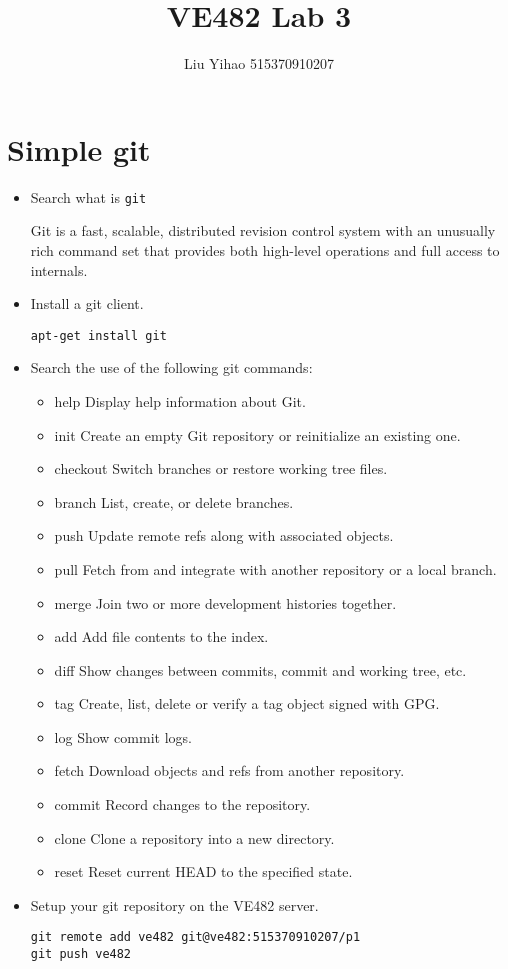 \documentclass{article}
\title{VE482 Lab 3}
\author{Liu Yihao 515370910207}
\date{}
\begin{document}
\maketitle

\section{Simple git}
\begin{itemize}
\item Search what is \texttt{git} 

Git is a fast, scalable, distributed revision control system with
       an unusually rich command set that provides both high-level
       operations and full access to internals.
\item Install a git client.
\begin{verbatim}
apt-get install git
\end{verbatim}
\item Search the use of the following git commands:
\begin{itemize}
\item help Display help information about Git.
\item init Create an empty Git repository or reinitialize an existing one.
\item checkout Switch branches or restore working tree files.
\item branch List, create, or delete branches.
\item push Update remote refs along with associated objects.
\item pull Fetch from and integrate with another repository or a local branch.
\item merge Join two or more development histories together.
\item add Add file contents to the index.
\item diff Show changes between commits, commit and working tree, etc.
\item tag Create, list, delete or verify a tag object signed with GPG.
\item log Show commit logs.
\item fetch Download objects and refs from another repository.
\item commit Record changes to the repository.
\item clone Clone a repository into a new directory.
\item reset Reset current HEAD to the specified state.
\end{itemize}
\item Setup your git repository on the VE482 server.
\begin{verbatim}
git remote add ve482 git@ve482:515370910207/p1
git push ve482
\end{verbatim}
\end{itemize}
\end{document}
